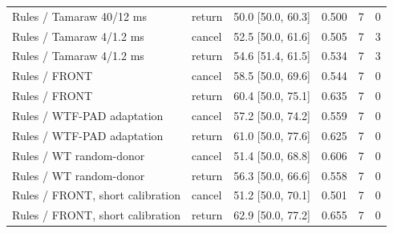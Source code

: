 \begin{longtable}{@{}llrrrr@{}}
Rules / Tamaraw 40/12 ms & return & 50.0 [50.0, 60.3] & 0.500 & 7 & 0\\
Rules / Tamaraw 4/1.2 ms & cancel & 52.5 [50.0, 61.6] & 0.505 & 7 & 3\\
Rules / Tamaraw 4/1.2 ms & return & 54.6 [51.4, 61.5] & 0.534 & 7 & 3\\
Rules / FRONT & cancel & 58.5 [50.0, 69.6] & 0.544 & 7 & 0\\
Rules / FRONT & return & 60.4 [50.0, 75.1] & 0.635 & 7 & 0\\
Rules / WTF-PAD adaptation & cancel & 57.2 [50.0, 74.2] & 0.559 & 7 & 0\\
Rules / WTF-PAD adaptation & return & 61.0 [50.0, 77.6] & 0.625 & 7 & 0\\
Rules / WT random-donor & cancel & 51.4 [50.0, 68.8] & 0.606 & 7 & 0\\
Rules / WT random-donor & return & 56.3 [50.0, 66.6] & 0.558 & 7 & 0\\
Rules / FRONT, short calibration & cancel & 51.2 [50.0, 70.1] & 0.501 & 7 & 0\\
Rules / FRONT, short calibration & return & 62.9 [50.0, 77.2] & 0.655 & 7 & 0\\
\bottomrule\end{longtable}
